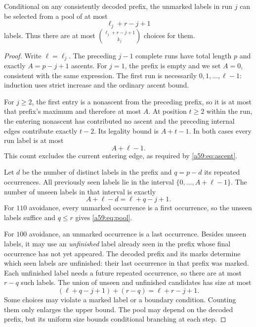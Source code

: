 \documentclass[11pt,letterpaper]{article}
\theoremstyle{remark}\newtheorem{remark}[theorem]{Remark}
\theoremstyle{remark}\newtheorem{wremark}{Remark}\renewcommand{\thewremark}{W\arabic{wremark}}
\theoremstyle{plain}\newtheorem{wcorollary}[wremark]{Corollary}
\begin{document}
\begin{lemma}\label{a59:lem:pool}
Conditional on any consistently decoded prefix, the unmarked labels in run $j$ can be selected from a pool of at most
\begin{equation}\label{a59:eq:pool}
 \ell_j+r-j+1
\end{equation}
labels. Thus there are at most $\binom{\ell_j+r-j+1}{k_j}$ choices for them.
\end{lemma}
\begin{proof}
Write $\ell=\ell_j$. The preceding $j-1$ complete runs have total length $p$ and exactly $A=p-j+1$ ascents. For $j=1$, the prefix is empty and we set $A=0$, consistent with the same expression. The first run is necessarily $0,1,\ldots,\ell-1$: induction uses strict increase and the ordinary ascent bound.

For $j\ge2$, the first entry is a nonascent from the preceding prefix, so it is at most that prefix's maximum and therefore at most $A$. At position $t\ge2$ within the run, the entering nonascent has contributed no ascent and the preceding internal edges contribute exactly $t-2$. Its legality bound is $A+t-1$. In both cases every run label is at most
\begin{equation}\label{a59:eq:ceiling}
 A+\ell-1.
\end{equation}
This count excludes the current entering edge, as required by \eqref{a59:eq:ascent}.

Let $d$ be the number of distinct labels in the prefix and $q=p-d$ its repeated occurrences. All previously seen labels lie in the interval $\{0,\ldots,A+\ell-1\}$. The number of unseen labels in that interval is exactly
\[
 A+\ell-d=\ell+q-j+1.
\]
For $110$ avoidance, every unmarked occurrence is a first occurrence, so the unseen labels suffice and $q\le r$ gives \eqref{a59:eq:pool}.

For $100$ avoidance, an unmarked occurrence is a last occurrence. Besides unseen labels, it may use an \emph{unfinished} label already seen in the prefix whose final occurrence has not yet appeared. The decoded prefix and its marks determine which seen labels are unfinished: their last occurrence in that prefix was marked. Each unfinished label needs a future repeated occurrence, so there are at most $r-q$ such labels. The union of unseen and unfinished candidates has size at most
\[
 (\ell+q-j+1)+(r-q)=\ell+r-j+1.
\]
Some choices may violate a marked label or a boundary condition. Counting them only enlarges the upper bound. The pool may depend on the decoded prefix, but its uniform size bounds conditional branching at each step.
\end{proof}
\end{document}

